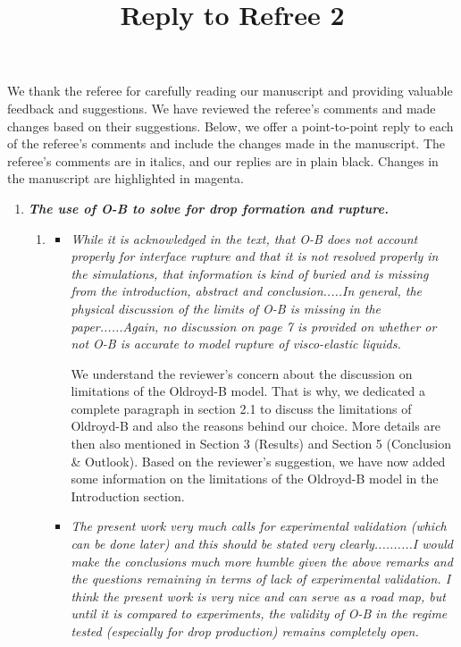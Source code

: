 \documentclass[]{article}
\title{\textbf{Reply to Refree 2}}
\date{\vspace{-5ex}}
\newcommand{\vsy}[1]{\todo[color=orange, bordercolor=none, textcolor=white]{Vatsal}\textcolor{orange}{#1}}
\begin{document}
\maketitle %

We thank the referee for carefully reading our manuscript and providing valuable feedback and suggestions. We have reviewed the referee’s comments and made changes based on their suggestions. Below, we offer a point-to-point reply to each of the referee’s comments and include the changes made in the manuscript. The referee’s comments are in italics, and our replies are in plain black. Changes in the manuscript are highlighted in magenta.

\begin{enumerate}
    \item \textbf{\textit{The use of O-B to solve for drop formation and rupture.}}
 \begin{enumerate}
    \item
     \begin{itemize}
        \item  \textit{While it is acknowledged in the text, that O-B does not account properly for interface rupture and that it is not resolved properly in the simulations, that information is kind of buried and is missing from the introduction, abstract and conclusion.....In general, the physical discussion of the limits of O-B is missing in the paper......Again, no discussion on page 7 is provided on whether or not O-B is accurate to model rupture of visco-elastic liquids.}

        We understand the reviewer's concern about the discussion on limitations of the Oldroyd-B model.
        That is why, we dedicated a complete paragraph in section 2.1 to discuss the limitations of Oldroyd-B and also the reasons behind our choice. More details are then also mentioned in Section 3 (Results) and Section 5 (Conclusion \& Outlook). Based on the reviewer's suggestion, we have now added some information on the limitations of the Oldroyd-B model in the Introduction section.


        \item \textit{The present work very much calls for experimental validation (which can be done later) and this should be stated very clearly..........I would make the conclusions much more humble given the above remarks and the questions remaining in terms of lack of experimental validation. I think the present work is very nice and can serve as a road map, but until it is compared to experiments, the validity of O-B in the regime tested (especially for drop production) remains completely open. }


\end{itemize}
\end{enumerate}
\end{enumerate}
\end{document}
